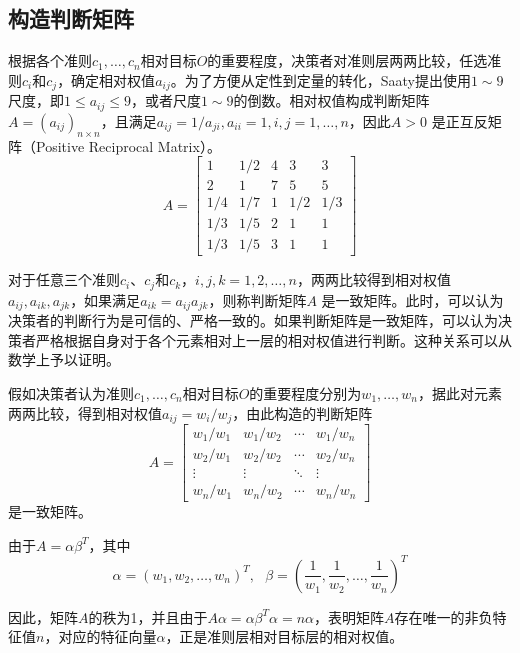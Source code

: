 \subsection{构造判断矩阵}
根据各个准则$c_1,\ldots,c_n$相对目标$O$的重要程度，决策者对准则层两两比较，任选准则$c_i$和$c_j$，确定相对权值$a_{ij}$。为了方便从定性到定量的转化，Saaty提出使用$1\sim 9$尺度，即$1\le a_{ij} \le 9$，或者尺度$1\sim 9$的倒数。相对权值构成判断矩阵$A=(a_{ij})_{n \times n}$，且满足$a_{ij}=1/a_{ji},a_{ii} = 1,i,j=1,\ldots,n$，因此$A>0$ 是正互反矩阵（Positive Reciprocal Matrix）。
\begin{equation}
A=
\begin{bmatrix}
    1 & 1/2 & 4 & 3 & 3\\
    2 & 1 & 7 & 5 & 5\\
    1/4 & 1/7 & 1 & 1/2 & 1/3\\
    1/3 & 1/5 & 2 & 1 & 1\\
    1/3 & 1/5 & 3 & 1 & 1
\end{bmatrix}
\end{equation}

对于任意三个准则$c_i$、$c_j$和$c_k$，$i,j,k = 1,2,\ldots,n$，两两比较得到相对权值$a_{ij},a_{ik},a_{jk}$，如果满足$a_{ik}=a_{ij}a_{jk}$，则称判断矩阵$A$ 是一致矩阵。此时，可以认为决策者的判断行为是可信的、严格一致的\cite{saaty2003decision}。如果判断矩阵是一致矩阵，可以认为决策者严格根据自身对于各个元素相对上一层的相对权值进行判断。这种关系可以从数学上予以证明。

假如决策者认为准则$c_1,\ldots,c_n$相对目标$O$的重要程度分别为$w_1,\ldots,w_n$，据此对元素两两比较，得到相对权值$a_{ij}=w_i/w_j$，由此构造的判断矩阵
\begin{equation}
A=
\begin{bmatrix}
    w_1/w_1 & w_1/w_2 & \cdots & w_1/w_n\\
    w_2/w_1 & w_2/w_2 & \cdots & w_2/w_n\\
    \vdots & \vdots & \ddots & \vdots\\
    w_n/w_1 & w_n/w_2 & \cdots & w_n/w_n
\end{bmatrix}
\end{equation}\label{eq:prm}
是一致矩阵。

由于$A=\alpha\beta^T$，其中
\[\alpha = (w_1,w_2,\ldots,w_n)^T,~~~\beta = (\frac{1}{w_1},\frac{1}{w_2},\ldots,\frac{1}{w_n})^T\]

因此，矩阵$A$的秩为1，并且由于$A\alpha=\alpha\beta^T\alpha=n\alpha$，表明矩阵$A$存在唯一的非负特征值$n$，对应的特征向量$\alpha$，正是准则层相对目标层的相对权值。

